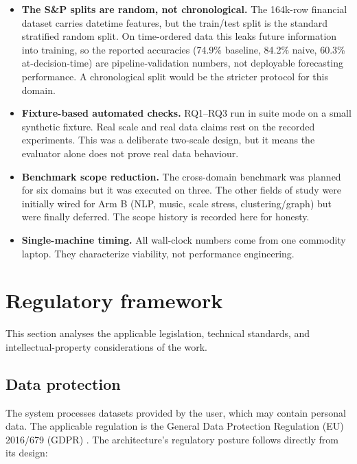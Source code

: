 \begin{itemize}
	\item \textbf{The S\&P splits are random, not chronological.} The 164k-row financial dataset carries datetime features, but the train/test split is the standard stratified random split. On time-ordered data this leaks future information into training, so the reported accuracies (74.9\% baseline, 84.2\% naive, 60.3\% at-decision-time) are pipeline-validation numbers, not deployable forecasting performance. A chronological split would be the stricter protocol for this domain.

	\item \textbf{Fixture-based automated checks.} RQ1--RQ3 run in suite mode on a small synthetic fixture. Real scale and real data claims rest on the recorded experiments. This was a deliberate two-scale design, but it means the evaluator alone does not prove real data behaviour.

	\item \textbf{Benchmark scope reduction.} The cross-domain benchmark was planned for six domains but it was executed on three. The other fields of study were initially wired for Arm B (NLP, music, scale stress, clustering/graph) but were finally deferred. The scope history is recorded here for honesty.

	\item \textbf{Single-machine timing.} All wall-clock numbers come from one commodity laptop. They characterize viability, not performance engineering.
\end{itemize}


\newpage
\section{Regulatory framework}
\label{sec:regulatory}

This section analyses the applicable legislation, technical standards, and intellectual-property considerations of the work.

\subsection{Data protection}

The system processes datasets provided by the user, which may contain personal data. The applicable regulation is the General Data Protection Regulation (EU) 2016/679 (GDPR) \cite{gdpr2016}. The architecture's regulatory posture follows directly from its design:


